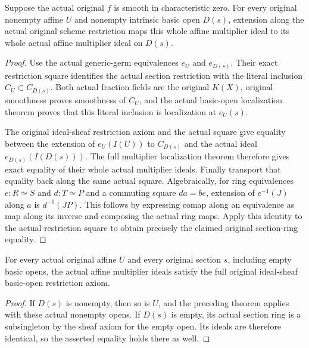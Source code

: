 \begin{theorem}\label{thm:sc0-original-scheme-multiplier-principal-nonempty}
\leanok
{}
Suppose the actual original $f$ is smooth in characteristic zero.
For every original nonempty affine $U$ and nonempty intrinsic basic
open $D(s)$, extension along the actual original scheme restriction
maps this whole affine multiplier ideal to its whole actual affine
multiplier ideal on $D(s)$.
\end{theorem}
\begin{proof}
Use the actual generic-germ equivalences $e_U$ and $e_{D(s)}$.
Their exact restriction square identifies the actual section
restriction with the literal inclusion $C_U\subset C_{D(s)}$.
Both actual fraction fields are the original $K(X)$, original
smoothness proves smoothness of $C_U$, and the actual basic-open
localization theorem proves that this literal inclusion is
localization at $e_U(s)$.

The original ideal-sheaf restriction axiom and the actual square
give equality between the extension of $e_U(I(U))$ to $C_{D(s)}$
and the actual ideal $e_{D(s)}(I(D(s)))$. The full multiplier
localization theorem therefore gives exact equality of their whole
actual multiplier ideals. Finally transport that equality back along
the same actual square. Algebraically, for ring equivalences
$e:R\simeq S$ and $d:T\simeq P$ and a commuting square
$d a=b e$, extension of $e^{-1}(J)$ along $a$ is
$d^{-1}(J P)$. This follows by expressing comap along an equivalence
as map along its inverse and composing the actual ring maps. Apply
this identity to the actual restriction square to obtain precisely
the claimed original section-ring equality.
\end{proof}

\begin{theorem}\label{thm:sc0-original-scheme-multiplier-principal}
\leanok
{}
For every actual original affine $U$ and every original section $s$,
including empty basic opens, the actual affine multiplier ideals
satisfy the full original ideal-sheaf basic-open restriction axiom.
\end{theorem}
\begin{proof}
If $D(s)$ is nonempty, then so is $U$, and the preceding theorem
applies with these actual nonempty opens. If $D(s)$ is empty, its
actual section ring is a subsingleton by the sheaf axiom for the
empty open. Its ideals are therefore identical, so the asserted
equality holds there as well.
\end{proof}
